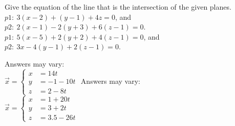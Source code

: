 
\begin{Exercise}[
name={},
title={}, 
difficulty=0,
origin={\cite{GHC}}]
Give the equation of the line that is the intersection of the given planes.
\Question $p1:\ 3 (x - 2) + (y - 1) + 4 z=0$, and \\
$p2:\ 2 (x - 1) - 2 (y + 3) + 6 (z - 1)=0$.
\Question $p1:\ 5 (x - 5) + 2 (y + 2) + 4 (z - 1)=0$, and \\
$p2:\ 3 x - 4 (y - 1) + 2 (z - 1)=0$.

\end{Exercise}

\begin{Answer}
\Question Answers may vary:\\
$\vec x = \left\{\begin{aligned} x &= 14t\\
y &= -1-10t\\
z&= 2-8t\end{aligned} \right.$
\Question Answers may vary:\\
$\vec x = \left\{\begin{aligned} x &=1+20t\\
y &= 3+2t\\
z&= 3.5-26t\end{aligned} \right.$

\end{Answer}
